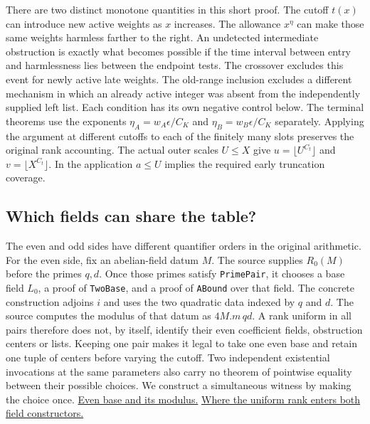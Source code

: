 \documentclass[12pt,letterpaper]{article}
\begin{document}
There are two distinct monotone quantities in this short proof. The cutoff $t(x)$ can introduce new active weights as $x$ increases. The allowance $x^\eta$ can make those same weights harmless farther to the right. An undetected intermediate obstruction is exactly what becomes possible if the time interval between entry and harmlessness lies between the endpoint tests. The crossover excludes this event for newly active late weights. The old-range inclusion excludes a different mechanism in which an already active integer was absent from the independently supplied left list. Each condition has its own negative control below. The terminal theorems use the exponents $\eta_A=w_A\epsilon/C_K$ and $\eta_B=w_B\epsilon/C_K$ separately. Applying the argument at different cutoffs to each of the finitely many slots preserves the original rank accounting. The actual outer scales $U\le X$ give $u=\lfloor U^{C_t}\rfloor$ and $v=\lfloor X^{C_t}\rfloor$. In the application $a\le U$ implies the required early truncation coverage.

\subsection{Which fields can share the table?}

The even and odd sides have different quantifier orders in the original arithmetic. For the even side, fix an abelian-field datum $M$. The source supplies $R_0(M)$ before the primes $q,d$. Once those primes satisfy \texttt{PrimePair}, it chooses a base field $L_0$, a proof of \texttt{TwoBase}, and a proof of \texttt{ABound} over that field. The concrete construction adjoins $i$ and uses the two quadratic data indexed by $q$ and $d$. The source computes the modulus of that datum as $4 M.m\,q d$. A rank uniform in all pairs therefore does not, by itself, identify their even coefficient fields, obstruction centers or lists. Keeping one pair makes it legal to take one even base and retain one tuple of centers before varying the cutoff. Two independent existential invocations at the same parameters also carry no theorem of pointwise equality between their possible choices. We construct a simultaneous witness by making the choice once. \href{https://github.com/nousentllc/riemann-hypothesis/blob/40e56bab026552e089d7afcfeff08d2defb9c005/src/Development/AutomorphicArithmetic/AutomorphicVarieties/QuadraticExtensions/ModulusAdjoinISqrtNegPrimes.lean#L16-L32}{Even base and its modulus.} \href{https://github.com/nousentllc/riemann-hypothesis/blob/40e56bab026552e089d7afcfeff08d2defb9c005/src/Development/AutomorphicArithmetic/AutomorphicVarieties/QuadraticExtensions/IsAlgClosureRat.lean#L87-L141}{Where the uniform rank enters both field constructors.}
\end{document}
